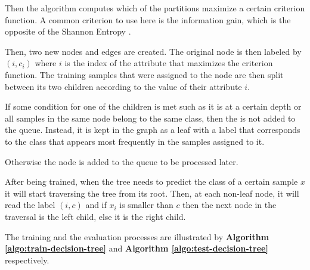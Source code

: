 Then the algorithm computes which of the partitions maximize a certain criterion function.
A common criterion to use here is the information gain, which is the opposite of the Shannon Entropy \cite{shannon1948mathematical}.

Then, two new nodes and edges are created.
The original node is then labeled by $(i, c_i)$ where $i$ is the index of the attribute that maximizes the criterion function.
The training samples that were assigned to the node are then split between its two children according to the value of their attribute $i$.

If some condition for one of the children is met such as it is at a certain depth or all samples in the same node belong to the same class, then the is not added to the queue.
Instead, it is kept in the graph as a leaf with a label that corresponds to the class that appears most frequently in the samples assigned to it.

Otherwise the node is added to the queue to be processed later.

After being trained, when the tree needs to predict the class of a certain sample $x$ it will start traversing the tree from its root. 
Then, at each non-leaf node, it will read the label $(i, c)$ and if $x_i$ is smaller than $c$ then the next node in the traversal is the left child, else it is the right child.

The training and the evaluation processes are illustrated by \textbf{Algorithm \ref{algo:train-decision-tree}} and \textbf{Algorithm \ref{algo:test-decision-tree}} respectively.

